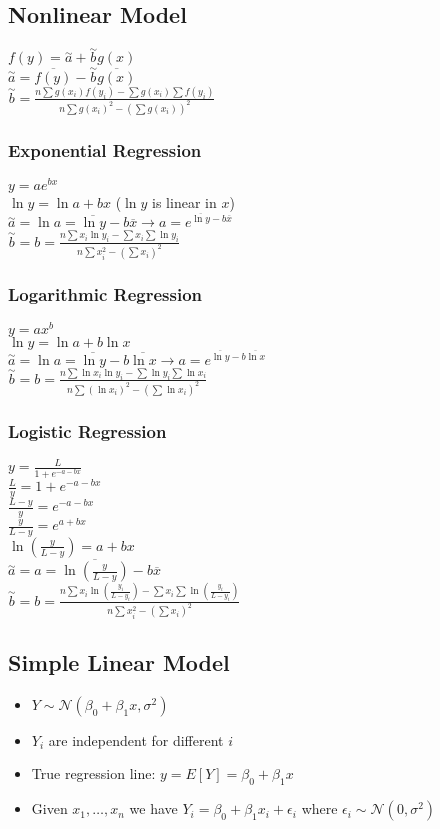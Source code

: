 \documentclass{article}
\begin{document}
\subsection{Nonlinear Model}
$f(y)=\overset{\sim}{a}+\overset{\sim}{b}g(x)$\\
$\overset{\sim}{a}=\overline{f(y)}-\overset{\sim}{b}\overline{g(x)}$\\
$\overset{\sim}{b}=\frac{n\sum g(x_i)f(y_i)-\sum g(x_i)\sum f(y_i)}{n\sum g(x_i)^2-(\sum g(x_i))^2}$
\subsubsection{Exponential Regression}
$y=ae^{bx}$\\
$\ln y=\ln a+bx$ ($\ln y$ is linear in $x$)\\
$\overset{\sim}{a}=\ln a=\overline{\ln y}-b\overline{x}\rightarrow a=e^{\overline{\ln y}-b\overline{x}}$\\
$\overset{\sim}{b}=b=\frac{n\sum x_i\ln y_i-\sum x_i\sum\ln y_i}{n\sum x_i^2-(\sum x_i)^2}$
\subsubsection{Logarithmic Regression}
$y=ax^b$\\
$\ln y=\ln a+b\ln x$\\
$\overset{\sim}{a}=\ln a=\overline{\ln y}-b\overline{\ln x}\rightarrow a=e^{\overline{\ln y}-b\overline{\ln x}}$\\
$\overset{\sim}{b}=b=\frac{n\sum\ln x_i\ln y_i-\sum\ln y_i\sum\ln x_i}{n\sum(\ln x_i)^2-(\sum\ln x_i)^2}$
\subsubsection{Logistic Regression}
$y=\frac{L}{1+e^{-a-bx}}$\\
$\frac{L}{y}=1+e^{-a-bx}$\\
$\frac{L-y}{y}=e^{-a-bx}$\\
$\frac{y}{L-y}=e^{a+bx}$\\
$\ln(\frac{y}{L-y})=a+bx$\\
$\overset{\sim}{a}=a=\overline{\ln(\frac{y}{L-y})}-b\overline{x}$\\
$\overset{\sim}{b}=b=\frac{n\sum x_i\ln(\frac{y_i}{L-y_i})-\sum x_i\sum\ln(\frac{y_i}{L-y_i})}{n\sum x_i^2-(\sum x_i)^2}$
\subsection{Simple Linear Model}
\begin{itemize}
    \item $Y\sim\mathcal{N}(\beta_0+\beta_1x,\sigma^2)$
    \item $Y_i$ are independent for different $i$
    \item True regression line: $y=E[Y]=\beta_0+\beta_1x$
    \item Given $x_1,\dots,x_n$ we have $Y_i=\beta_0+\beta_1x_i+\epsilon_i$ where $\epsilon_i\sim\mathcal{N}(0,\sigma^2)$
\end{itemize}
\end{document}
